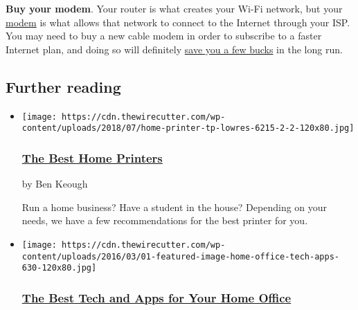 \textbf{Buy your modem}. Your router is what creates your Wi-Fi network,
but your
\href{https://www.nytimes.com/wirecutter/reviews/best-cable-modem/}{modem}
is what allows that network to connect to the Internet through your ISP.
You may need to buy a new cable modem in order to subscribe to a faster
Internet plan, and doing so will definitely
\href{https://www.nytimes.com/wirecutter/reviews/best-cable-modem/\#who-this-is-for}{save
you a few bucks} in the long run.

\hypertarget{further-reading}{%
\subsection{Further reading}\label{further-reading}}

\begin{itemize}
\item
  \href{https://www.nytimes.com/wirecutter/reviews/best-home-printers/}{}

  \texttt{[image: https://cdn.thewirecutter.com/wp-content/uploads/2018/07/home-printer-tp-lowres-6215-2-2-120x80.jpg]}

  \hypertarget{the-best-home-printers}{%
  \subsubsection{\texorpdfstring{\href{https://www.nytimes.com/wirecutter/reviews/best-home-printers/}{The
  Best Home
  Printers}}{The Best Home Printers}}\label{the-best-home-printers}}

  by Ben Keough

  Run a home business? Have a student in the house? Depending on your
  needs, we have a few recommendations for the best printer for you.
\item
  \href{https://www.nytimes.com/wirecutter/reviews/the-best-tech-and-apps-for-your-home-office/}{}

  \texttt{[image: https://cdn.thewirecutter.com/wp-content/uploads/2016/03/01-featured-image-home-office-tech-apps-630-120x80.jpg]}

  \hypertarget{the-best-tech-and-apps-for-your-home-office}{%
  \subsubsection{\texorpdfstring{\href{https://www.nytimes.com/wirecutter/reviews/the-best-tech-and-apps-for-your-home-office/}{The
  Best Tech and Apps for Your Home
  Office}}{The Best Tech and Apps for Your Home Office}}\label{the-best-tech-and-apps-for-your-home-office}}


\end{itemize}

